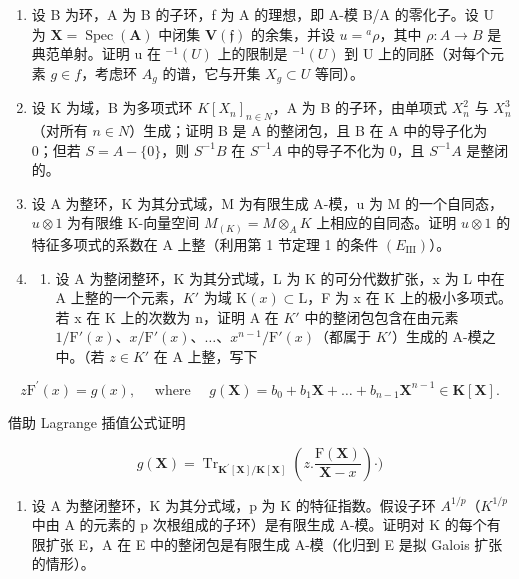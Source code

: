 \begin{enumerate}
\def\labelenumi{\arabic{enumi}.}
\setcounter{enumi}{15}
\item
  设 B 为环，A 为 B 的子环，f 为 A 的理想，即 A-模 B/A 的零化子。设 U 为 \(\mathbf{X} = \operatorname{Spec}(\mathbf{A})\) 中闭集 \(\mathbf{V}(\mathfrak{f})\) 的余集，并设 \(u = {}^{a}\rho\)，其中 \(\rho: A \to B\) 是典范单射。证明 u 在 \({}^{-1}(U)\) 上的限制是 \({}^{-1}(U)\) 到 U 上的同胚（对每个元素 \(g \in f\)，考虑环 \(A_{g}\) 的谱，它与开集 \(X_{g} \subset U\) 等同）。
\item
  设 K 为域，B 为多项式环 \(K[X_{n}]_{n\in N}\)，A 为 B 的子环，由单项式 \(X_{n}^{2}\) 与 \(X_{n}^{3}\)（对所有 \(n\in N\)）生成；证明 B 是 A 的整闭包，且 B 在 A 中的导子化为 0；但若 \(S=A-\{0\}\)，则 \(S^{-1}B\) 在 \(S^{-1}A\) 中的导子不化为 0，且 \(S^{-1}A\) 是整闭的。
\item
  设 A 为整环，K 为其分式域，M 为有限生成 A-模，u 为 M 的一个自同态，\(u \otimes 1\) 为有限维 K-向量空间 \(M_{(K)} = M \otimes_{A} K\) 上相应的自同态。证明 \(u \otimes 1\) 的特征多项式的系数在 A 上整（利用第 1 节定理 1 的条件 \((E_{\mathrm{III}})\)）。
\item
  \begin{enumerate}
  \def\labelenumii{(\alph{enumii})}
  \tightlist
  \item
    设 A 为整闭整环，K 为其分式域，L 为 K 的可分代数扩张，x 为 L 中在 A 上整的一个元素，\(K'\) 为域 \(\mathrm{K}(x) \subset \mathrm{L}\)，F 为 x 在 K 上的极小多项式。若 x 在 K 上的次数为 n，证明 A 在 \(K'\) 中的整闭包包含在由元素 \(1/\mathrm{F}'(x)\)、\(x/\mathrm{F}'(x)\)、\(\ldots\)、\(x^{n-1}/\mathrm{F}'(x)\)（都属于 \(K'\)）生成的 A-模之中。（若 \(z \in K'\) 在 A 上整，写下
  \end{enumerate}
\end{enumerate}

\[
z \mathrm{F} ^ {\prime} (x) = g (x), \quad \text { where } \quad g (\mathbf {X}) = b _ {0} + b _ {1} \mathbf {X} + \dots + b _ {n - 1} \mathbf {X} ^ {n - 1} \in \mathbf {K} [ \mathbf {X} ].
\]

借助 Lagrange 插值公式证明

\[
g (\mathbf {X}) = \operatorname{Tr} _ {\mathbf {K} ^ {\prime} [ \mathbf {X} ] / \mathbf {K} [ \mathbf {X} ]} \left(z. \frac {\mathrm{F} (\mathbf {X})}{\mathbf {X} - x}\right) \cdot)
\]

\begin{enumerate}
\def\labelenumi{(\alph{enumi})}
\setcounter{enumi}{1}
\tightlist
\item
  设 A 为整闭整环，K 为其分式域，p 为 K 的特征指数。假设子环 \(A^{1/p}\)（\(K^{1/p}\) 中由 A 的元素的 p 次根组成的子环）是有限生成 A-模。证明对 K 的每个有限扩张 E，A 在 E 中的整闭包是有限生成 A-模（化归到 E 是拟 Galois 扩张的情形）。
\end{enumerate}

